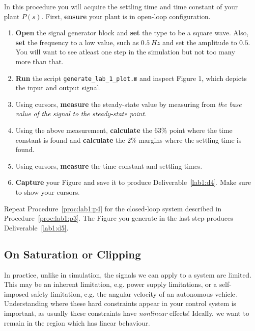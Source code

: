 \begin{procedure}[label={proc:lab1:p4}]
  In this procedure you will acquire the settling time and time constant
  of your plant \(P(s).\) First, \textbf{ensure} your plant is in open-loop
  configuration.
  \begin{enumerate}[label=(\arabic*)]
    \item{
      \textbf{Open} the signal generator block and \textbf{set} the type
      to be a square wave. Also, \textbf{set} the frequency to a low value,
      such as \(\SI{0.5}{Hz}\) and set the amplitude to \(0.5.\)
      You will want to see atleast one step in the simulation but not too
      many more than that.
    }
    \item{
      \textbf{Run} the script \texttt{generate\_lab\_1\_plot.m} and inspect
      Figure 1, which depicts the input and output signal.
    }
    \item{
      Using cursors, \textbf{measure} the steady-state value by measuring from
      \emph{the base value of the signal to the steady-state point}.
    }
    \item{
      Using the above measurement, \textbf{calculate} the \(63\%\) point
      where the time constant is found and \textbf{calculate} the \(2\%\)
      margins where the settling time is found.
    }
    \item{
      Using cursors, \textbf{measure} the time constant and settling times.
    }
    \item{
      \textbf{Capture} your Figure and save it to produce Deliverable~\ref{lab1:d4}.
      Make sure to show your cursors.
    }
  \end{enumerate}
\end{procedure}
%
\begin{procedure}[label={proc:lab1:p5}]
  Repeat Procedure~\ref{proc:lab1:p4} for the closed-loop system described in
  Procedure~\ref{proc:lab1:p3}.
  The Figure you generate in the last step produces Deliverable~\ref{lab1:d5}.
\end{procedure}
%

\subsection{On Saturation or Clipping}
In practice, unlike in simulation, the signals we can apply to a system are
limited. This may be an inherent limitation, e.g.
power supply limitations, or a self-imposed safety limitation, e.g.
the angular velocity of an autonomous vehicle. Understanding where these hard
constraints appear in your control system is important, as usually these
constraints have \emph{nonlinear} effects! Ideally, we want to remain in
the region which has linear behaviour.

